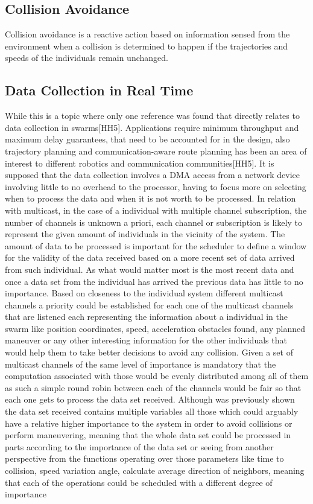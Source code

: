 \documentclass[journal]{IEEEtran}
\begin{document}
\begin{itemize}
\subsection{Collision Avoidance}
Collision avoidance is a reactive action based on information sensed from the environment when a collision is determined to happen if the trajectories and speeds of the individuals remain unchanged.
\subsection{Data Collection in Real Time}

While this is a topic where only one reference was found that directly relates to data collection in swarms[HH5]. Applications require minimum throughput and maximum delay guarantees, that need to be accounted for in the design, also trajectory planning  and communication-aware route planning has been an area of interest to different robotics and communication communities[HH5].
It is supposed that the data collection involves a DMA access from a network device involving little to no overhead to the processor, having to focus more on selecting when to process the data and when it is not worth to be processed.
In relation with multicast, in the case of a individual with multiple channel subscription, the number of channels is unknown a priori, each channel or subscription is likely to represent the given amount of individuals in the vicinity of the system. The amount of data to be processed is important for the scheduler to define a window for the validity of the data received based on a more recent set of data arrived from such individual. As what would matter most is the most recent data and once a data set from the individual has arrived the previous data has little to no importance.
Based on closeness to the individual system different multicast channels a priority could be established for each one of the multicast channels that are listened each representing the information about a individual in the swarm like position coordinates, speed, acceleration obstacles found, any planned maneuver or any other interesting information for the other individuals that would help them to take better decisions to avoid any collision.
Given a set of multicast channels of the same level of importance is mandatory that the computation associated with those would be evenly distributed among all of them as such a simple round robin between each of the channels would be fair so that each one gets to process the data set received.
Although was previously shown the data set received contains multiple variables all those which could arguably have a relative higher importance to the system in order to avoid collisions or perform maneuvering, meaning that the whole data set could be processed in parts according to the importance of the data set or seeing from another perspective from the functions operating over those parameters like time to collision, speed variation angle, calculate average direction of neighbors, meaning that each of the operations could be scheduled with a different degree of importance

\end{itemize}
\end{document}
